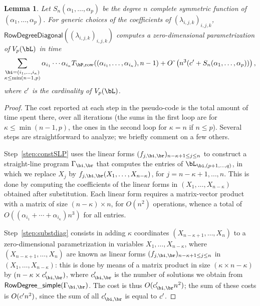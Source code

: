 \documentclass[12pt]{article}
\newtheorem{lemma}[definition]{Lemma}
\begin{document}
\begin{lemma}\label{lemma:rowdegreediagonal}
  Let $S_n(\alpha_1,\dots,\alpha_p)$ be the degree $n$ complete
  symmetric function of $(\alpha_1,\dots,\alpha_p)$. For generic 
  choices of the coefficients of $(\lambda_{i,j,k})_{i,j,k}$,
  $\mathsf{RowDegreeDiagonal}((\lambda_{i,j,k})_{i,j,k})$
  computes a zero-dimensional parametrization of $V_p(\bL)$
  in time $$\sum_{\substack{\bi=(i_1,\dots,i_\kappa)\\ \kappa\le\min(n-1,p)}}
  \alpha_{i_1} \cdots \alpha_{i_\kappa} T_{\bP,{\rm
      row}}((\alpha_{i_1},\dots,\alpha_{i_\kappa}), n-1) + \softO\left (n^3(\rc + S_n(\alpha_1,\dots,\alpha_p))  \right),$$
  where ${c'}{}$ is the cardinality of $V_p(\bL)$.
\end{lemma}
\begin{proof}
  The cost reported at each step in the pseudo-code is the total amount
  of time spent there, over all iterations (the sums in the first loop
  are for $\kappa \le \min(n-1,p)$, the ones in the second loop for
  $\kappa=n$ if $n \le p$). Several steps are straightforward to
  analyze; we briefly comment on a few others.

  Step~\ref{step:constSLP} uses the linear forms
  $(f_{j,\bi,\br})_{n-\kappa+1 \le j \le n}$ to construct a
  straight-line program $\Gamma_{\bi,\br}$ that computes the entries
  of $\bL_{\bi,(p+1, \ldots, q)}$, in which we replace $X_j$ by
  $f_{j,\bi,\br}(X_1, \ldots, X_{n-\kappa})$, for
  $j=n-\kappa+1,\dots,n$.  This is done by computing the coefficients
  of the linear forms in $(X_1,\dots,X_{n-\kappa})$ obtained after
  substitution. Each linear form requires a matrix-vector product with
  a matrix of size $(n-\kappa) \times n$, for $O(n^2)$ operations,
  whence a total of $O((\alpha_{i_1} + \cdots +\alpha_{i_\kappa})n^3)$
  for all entries.

  Step~\ref{step:substdiag} consists in adding $\kappa$ coordinates
  $(X_{n-\kappa+1},\dots,X_n)$ to a zero-dimensional parametrization
  in variables $X_1,\dots,X_{n-\kappa}$, where
  $(X_{n-\kappa+1},\dots,X_n)$ are known as linear forms
  $(f_{j,\bi,\br})_{n-\kappa+1 \le j \le n}$ in $(X_1, \ldots,
  X_{n-\kappa})$: this is done by means of a matrix product in size
  $(\kappa \times n-\kappa)$ by $(n-\kappa \times c'_{\bi,\br})$,
  where $c'_{\bi,\br}$ is the number of solutions we obtain from
  $\mathsf{RowDegree\_simple}(\Gamma_{\bi,\br})$. The cost is thus
  $O(c'_{\bi,\br}n^2 )$; the sum of these costs is $O({c'}{} n^2 )$,
  since the sum of all $c'_{\bi,\br}$ is equal to ${c'}{}$.


\end{proof}
\end{document}
